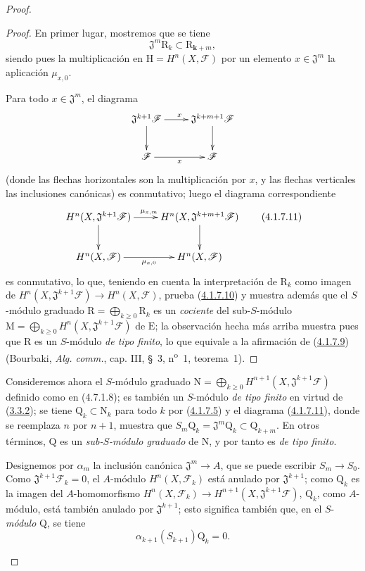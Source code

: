 \begin{proof}
\begin{proof}
En primer lugar, mostremos que se tiene
\[
\mathfrak J^m\mathrm R_k\subset\mathrm R_{\boldsymbol{k}+m},
\tag{4.1.7.10}\label{III.4.1.7.10-fr}
\]
siendo pues la multiplicación en $\mathrm H=H^n(X,\mathcal F)$ por un elemento
$x\in\mathfrak J^m$ la aplicación $\mu_{x,0}$.

Para todo
$x\in\mathfrak J^m$, el diagrama
\[
\xymatrix{
\mathfrak J^{k+1}\mathcal F\ar[r]^x\ar[d]&
\mathfrak J^{k+m+1}\mathcal F\ar[d]\\
\mathcal F\ar[r]_x&\mathcal F
}
\]
(donde las flechas horizontales son la multiplicación por $x$, y las
flechas verticales las inclusiones canónicas) es conmutativo; luego el
diagrama correspondiente
\[
\xymatrix{
H^n(X,\mathfrak J^{k+1}\mathcal F)\ar[r]^{\mu_{x,m}}\ar[d]&
H^n(X,\mathfrak J^{k+m+1}\mathcal F)\ar[d]\\
H^n(X,\mathcal F)\ar[r]_{\mu_{x,0}}&H^n(X,\mathcal F)
}
\tag{4.1.7.11}\label{III.4.1.7.11-fr}
\]
es conmutativo, lo que, teniendo en cuenta la interpretación de $\mathrm R_k$
como imagen de
$H^n(X,\mathfrak J^{k+1}\mathcal F)\to H^n(X,\mathcal F)$, prueba
(\hyperref[III.4.1.7.10-fr]{4.1.7.10}) y muestra además que el $S$-módulo
graduado $\mathrm R=\bigoplus_{k\geq0}\mathrm R_k$ es un \emph{cociente} del
sub-$S$-módulo
$\mathrm M=\bigoplus_{k\geq0}H^n(X,\mathfrak J^{k+1}\mathcal F)$ de
$\mathrm E$; la observación hecha más arriba muestra pues que $\mathrm R$ es
un $S$-módulo \emph{de tipo finito}, lo que equivale a la afirmación de
(\hyperref[III.4.1.7.9-fr]{4.1.7.9}) (Bourbaki, \emph{Alg. comm.},
cap. III, §~3, n\textsuperscript{o}~1, teorema~1).
\end{proof}

\begin{env}[4.1.7.12]
\label{III.4.1.7.12-fr}
Consideremos ahora el $S$-módulo graduado
$\mathrm N=\bigoplus_{k\geq0}H^{n+1}(X,\mathfrak J^{k+1}\mathcal F)$
definido como en (4.7.1.8); es también un $S$-módulo \emph{de tipo finito} en
virtud de (\hyperref[III.3.3.2-fr]{3.3.2}); se tiene
$\mathrm Q_k\subset\mathrm N_k$ para todo $k$ por
(\hyperref[III.4.1.7.5-fr]{4.1.7.5}) y el diagrama
(\hyperref[III.4.1.7.11-fr]{4.1.7.11}), donde se reemplaza $n$ por $n+1$,
muestra que
$S_m\mathrm Q_k=\mathfrak J^m\mathrm Q_k\subset\mathrm Q_{k+m}$.
En otros términos, $\mathrm Q$ es un \emph{sub-$S$-módulo graduado} de $\mathrm N$,
y por tanto es \emph{de tipo finito}.
\end{env}

\begin{env}[4.1.7.13]
\label{III.4.1.7.13-fr}
Designemos por $\alpha_m$ la inclusión canónica
$\mathfrak J^m\to A$, que se puede escribir $S_m\to S_0$. Como
$\mathfrak J^{k+1}\mathcal F_k=0$, el $A$-módulo
$H^n(X,\mathcal F_k)$ está anulado por $\mathfrak J^{k+1}$; como
$\mathrm Q_k$ es la imagen del $A$-homomorfismo
$H^n(X,\mathcal F_k)\to H^{n+1}(X,\mathfrak J^{k+1}\mathcal F)$,
$\mathrm Q_k$, como $A$-módulo, está también anulado por
$\mathfrak J^{k+1}$; esto significa también que, en el $S$-\emph{módulo}
$\mathrm Q$, se tiene
\[
\alpha_{k+1}(S_{k+1})\mathrm Q_k=0.
\tag{4.1.7.14}\label{III.4.1.7.14-fr}
\]


\end{env}
\end{proof}
